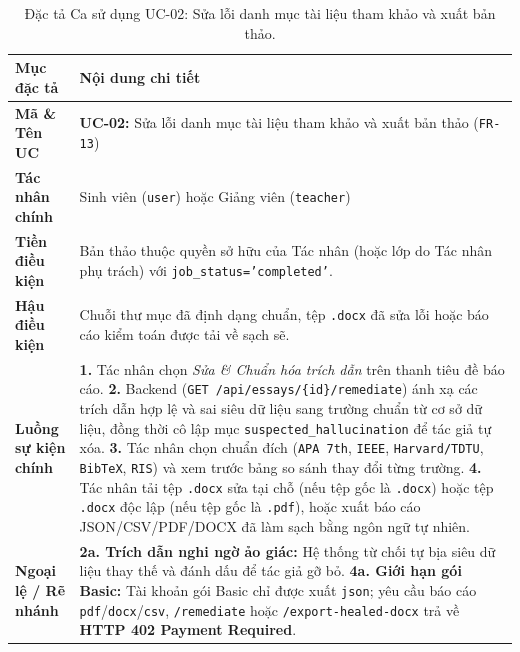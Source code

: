 \begin{table}[!htbp]
\centering
\caption{Đặc tả Ca sử dụng UC-02: Sửa lỗi danh mục tài liệu tham khảo và xuất bản thảo.}\label{tab:uc02}
\begin{tabular}{|L{0.24}|L{0.76}|}
\hline
\textbf{Mục đặc tả} & \textbf{Nội dung chi tiết} \\
\hline
\textbf{Mã \& Tên UC} & \textbf{UC-02:} Sửa lỗi danh mục tài liệu tham khảo và xuất bản thảo (\texttt{FR-13}) \\
\hline
\textbf{Tác nhân chính} & Sinh viên (\texttt{user}) hoặc Giảng viên (\texttt{teacher}) \\
\hline
\textbf{Tiền điều kiện} & Bản thảo thuộc quyền sở hữu của Tác nhân (hoặc lớp do Tác nhân phụ trách) với \texttt{job\_status='completed'}. \\
\hline
\textbf{Hậu điều kiện} & Chuỗi thư mục đã định dạng chuẩn, tệp \texttt{.docx} đã sửa lỗi hoặc báo cáo kiểm toán được tải về sạch sẽ. \\
\hline
\textbf{Luồng sự kiện chính} & \textbf{1.} Tác nhân chọn \textit{Sửa \& Chuẩn hóa trích dẫn} trên thanh tiêu đề báo cáo. \newline \textbf{2.} Backend (\texttt{GET /api/essays/\{id\}/remediate}) ánh xạ các trích dẫn hợp lệ và sai siêu dữ liệu sang trường chuẩn từ cơ sở dữ liệu, đồng thời cô lập mục \texttt{suspected\_hallucination} để tác giả tự xóa. \newline \textbf{3.} Tác nhân chọn chuẩn đích (\texttt{APA 7th}, \texttt{IEEE}, \texttt{Harvard/TDTU}, \texttt{BibTeX}, \texttt{RIS}) và xem trước bảng so sánh thay đổi từng trường. \newline \textbf{4.} Tác nhân tải tệp \texttt{.docx} sửa tại chỗ (nếu tệp gốc là \texttt{.docx}) hoặc tệp \texttt{.docx} độc lập (nếu tệp gốc là \texttt{.pdf}), hoặc xuất báo cáo JSON/CSV/PDF/DOCX đã làm sạch bằng ngôn ngữ tự nhiên. \\
\hline
\textbf{Ngoại lệ / Rẽ nhánh} & \textbf{2a. Trích dẫn nghi ngờ ảo giác:} Hệ thống từ chối tự bịa siêu dữ liệu thay thế và đánh dấu để tác giả gỡ bỏ. \newline \textbf{4a. Giới hạn gói Basic:} Tài khoản gói Basic chỉ được xuất \texttt{json}; yêu cầu báo cáo \texttt{pdf}/\texttt{docx}/\texttt{csv}, \texttt{/remediate} hoặc \texttt{/export-healed-docx} trả về \textbf{HTTP 402 Payment Required}. \\
\hline
\end{tabular}
\end{table}

